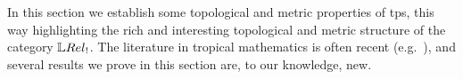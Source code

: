 
In this section we establish some topological and metric properties of tps, this way highlighting the rich and interesting topological and metric structure of the category $\LREL_{!}$.
The literature in tropical mathematics is often recent (e.g.~\cite{Porzio2021}), and several results we prove in this section are, to our knowledge, new.
%
%

%


% 

